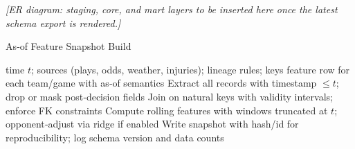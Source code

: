 
\begin{center}
  \textit{[ER diagram: staging, core, and mart layers to be inserted here once the latest schema export is rendered.]}
\end{center}
\begin{algorithm}[t]
  \caption{As‑of Feature Snapshot Build}
  \label{alg:asof-snapshot}
  \begin{algorithmic}[1]
    \Require time $t$; sources (plays, odds, weather, injuries); lineage rules; keys
    \Ensure feature row for each team/game with as‑of semantics
    \State Extract all records with timestamp $\le t$; drop or mask post‑decision fields
    \State Join on natural keys with validity intervals; enforce FK constraints
    \State Compute rolling features with windows truncated at $t$; opponent‑adjust via ridge if enabled
    \State Write snapshot with hash/id for reproducibility; log schema version and data counts
  \end{algorithmic}
\end{algorithm}
